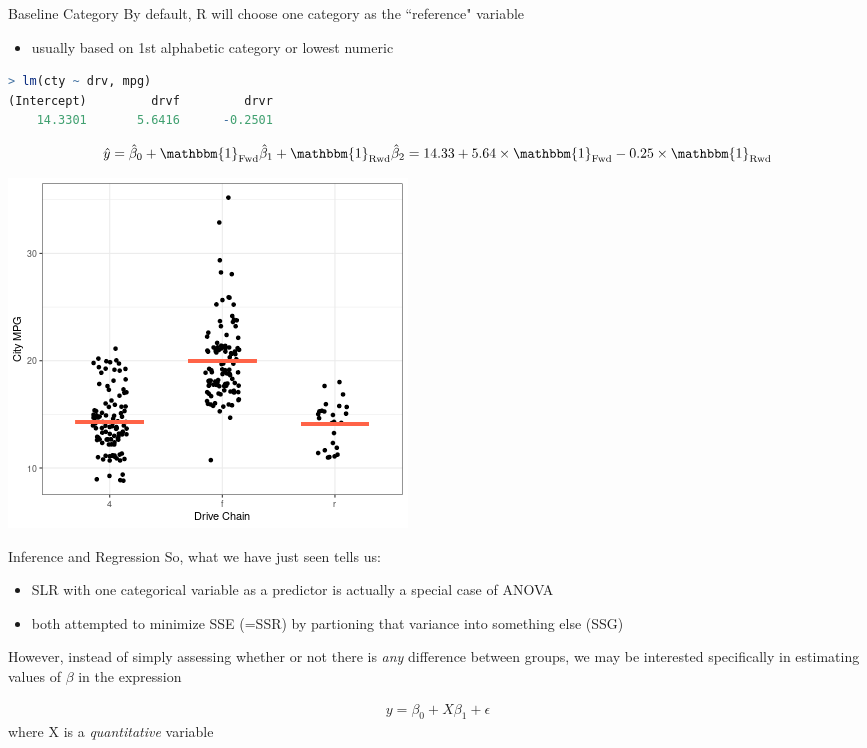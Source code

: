 \documentclass{beamer}
\begin{document}
\begin{frame}[fragile]{Baseline Category}
\small
By default, R will choose one category as the ``reference" variable
\begin{itemize}
    \item usually based on 1st alphabetic category or lowest numeric
\end{itemize}

\begin{lstlisting}[language=R]
> lm(cty ~ drv, mpg)
(Intercept)         drvf         drvr  
    14.3301       5.6416      -0.2501  
\end{lstlisting} \vspace{-4mm}

\begin{align*}
\hat{y} = \hat{\beta}_0 + \mathbbm{1}_{\text{Fwd}} \hat{\beta}_1+ \mathbbm{1}_{\text{Rwd}} \hat{\beta}_2 = 14.33 + 5.64 \times \mathbbm{1}_{\text{Fwd}} - 0.25 \times \mathbbm{1}_{\text{Rwd}}
\end{align*}

\begin{center}
\includegraphics[scale=0.37]{ctympg3.png}
\end{center}

\end{frame}


\begin{frame}{Inference and Regression}
So, what we have just seen tells us:
\begin{itemize}
    \item SLR with one categorical variable as a predictor is actually a special case of ANOVA
    \item both attempted to minimize SSE (=SSR) by partioning that variance into something else (SSG)
\end{itemize} \vspace{10mm}

However, instead of simply assessing whether or not there is \textit{any} difference between groups, we may be interested specifically in estimating values of $\beta$ in the expression \vspace{-4mm}

\begin{align*}
y = \beta_0 + X \beta_1 + \epsilon
\end{align*}
where X is a \textit{quantitative} variable
\end{frame}
\end{document}
